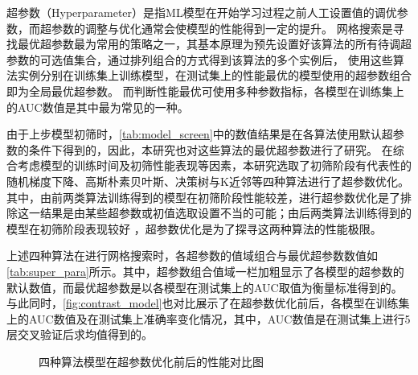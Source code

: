 超参数（Hyperparameter）是指ML模型在开始学习过程之前人工设置值的调优参数\cite{scikit-learn,Aurélien2018}，而超参数的调整与优化通常会使模型的性能得到一定的提升。
网格搜索是寻找最优超参数最为常用的策略之一，其基本原理为预先设置好该算法的所有待调超参数的可选值集合，通过排列组合的方式得到该算法的多个实例后，
使用这些算法实例分别在训练集上训练模型，在测试集上的性能最优的模型使用的超参数组合即为全局最优超参数\cite{Aurélien2018}。
而判断性能最优可使用多种参数指标，各模型在训练集上的AUC数值是其中最为常见的一种。

由于上步模型初筛时，\autoref{tab:model_screen}中的数值结果是在各算法使用默认超参数的条件下得到的，因此，本研究也对这些算法的最优超参数进行了研究。
在综合考虑模型的训练时间及初筛性能表现等因素，本研究选取了初筛阶段有代表性的随机梯度下降、高斯朴素贝叶斯、决策树与K近邻等四种算法进行了超参数优化。
其中，由前两类算法训练得到的模型在初筛阶段性能较差，进行超参数优化是了排除这一结果是由某些超参数或初值选取设置不当的可能；由后两类算法训练得到的模型在初筛阶段表现较好
，超参数优化是为了探寻这两种算法的性能极限。

上述四种算法在进行网格搜索时，各超参数的值域组合与最优超参数数值如\autoref{tab:super_para}所示。其中，超参数组合值域一栏加粗显示了各模型的超参数的默认数值，而最优超参数是以各模型在测试集上的AUC取值为衡量标准得到的。
与此同时，\autoref{fig:contrast_model}也对比展示了在超参数优化前后，各模型在训练集上的AUC数值及在测试集上准确率变化情况，其中，AUC数值是在测试集上进行5层交叉验证后求均值得到的。

\begin{figure}[htbp]
    \centering
    \quad
    \caption{\label{fig:contrast_model}四种算法模型在超参数优化前后的性能对比图}
\end{figure}

